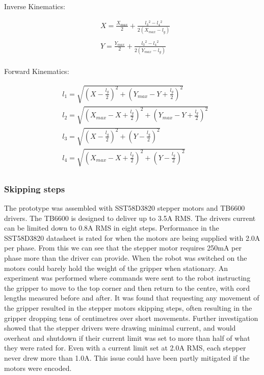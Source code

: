 \documentclass[conference]{IEEEtran}
\begin{document}
	Inverse Kinematics:
	
	\begin{equation}
	\begin{aligned}
	&X = \frac{X_{max}}{2} + \frac{l_3{}^2 - l_4{}^2}{2\left(X_{max} - l_g\right)}\\ \\
	&Y = \frac{Y_{max}}{2} + \frac{l_3{}^2 - l_4{}^2}{2\left(Y_{max} - l_g\right)}\\
	\end{aligned}
	\end{equation}
	
	Forward Kinematics:
	
	\begin{equation}
	\begin{aligned}
	&l_1 = \sqrt{\left(X - \frac{l_g}{2}\right)^2 + \left(Y_{max}-Y+\frac{l_g}{2}\right)^2}\\
	&l_2 = \sqrt{\left(X_{max}-X+\frac{l_g}{2}\right)^2 + \left(Y_{max}-Y+\frac{l_g}{2}\right)^2}\\
	&l_3 = \sqrt{\left(X-\frac{l_g}{2}\right)^2 + \left(Y-\frac{l_g}{2}\right)^2}\\
	&l_4 = \sqrt{\left(X_{max}-X+\frac{l_g}{2}\right)^2 + \left(Y-\frac{l_g}{2}\right)^2}\\
	\end{aligned}
	\end{equation}
	
	\subsubsection{Skipping steps}\label{motor_issues}
	The prototype was assembled with SST58D3820 stepper motors and TB6600 drivers. The TB6600 is designed to deliver up to 3.5A RMS. The drivers current can be limited down to 0.8A RMS in eight steps. Performance in the SST58D3820 datasheet is rated for when the motors are being supplied with 2.0A per phase. From this we can see that the stepper motor requires 250mA per phase more than the driver can provide. When the robot was switched on the motors could barely hold the weight of the gripper when stationary. An experiment was performed where commands were sent to the robot instructing the gripper to move to the top corner and then return to the centre, with cord lengths measured before and after. It was found that requesting any movement of the gripper resulted in the stepper motors skipping steps, often resulting in the gripper dropping tens of centimetres over short movements. Further investigation showed that the stepper drivers were drawing minimal current, and would overheat and shutdown if their current limit was set to more than half of what they were rated for. Even with a current limit set at 2.0A RMS, each stepper never drew more than 1.0A. This issue could have been partly mitigated if the motors were encoded.
\end{document}

